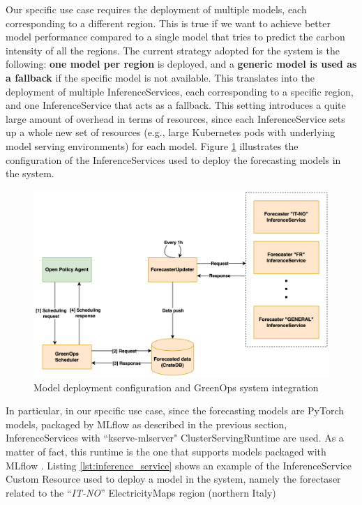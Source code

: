 Our specific use case requires the deployment of multiple models, each corresponding to a different region.
This is true if we want to achieve better model performance compared to a single model that tries to predict the carbon intensity of all the regions.
The current strategy adopted for the system is the following: \textbf{one model per region} is deployed, and a \textbf{generic model is used as a fallback} if the specific model is not available.
This translates into the deployment of multiple InferenceServices, each corresponding to a specific region, and one InferenceService that acts as a fallback.
This setting introduces a quite large amount of overhead in terms of resources, since each InferenceService sets up a whole new set of resources (e.g., large Kubernetes pods with underlying model serving environments) for each model.
Figure \ref{fig:forecaster} illustrates the configuration of the InferenceServices used to deploy the forecasting models in the system.

\begin{figure}[t]
  \centering
  \includegraphics[width=0.85\linewidth]{images/forecaster.png}
  \caption{Model deployment configuration and GreenOps system integration}
  \label{fig:forecaster}
\end{figure}

In particular, in our specific use case, since the forecasting models are PyTorch models, packaged by MLflow as described in the previous section, InferenceServices with ``kserve-mlserver" ClusterServingRuntime are used. 
As a matter of fact, this runtime is the one that supports models packaged with MLflow \cite{kserve_mlflow}.
Listing \ref{lst:inference_service} shows an example of the InferenceService Custom Resource used to deploy a model in the system, namely the forectaser related to the ``\textit{IT-NO}'' ElectricityMaps region (northern Italy) \\

